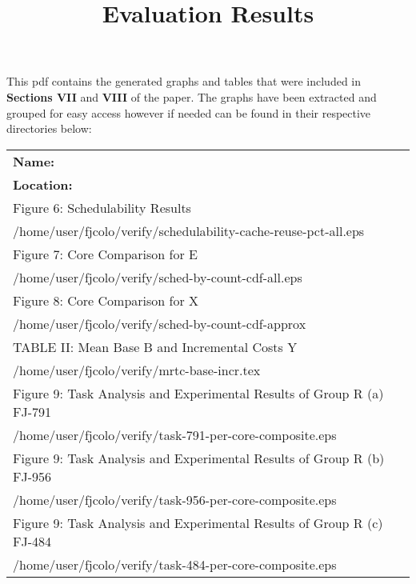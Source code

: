 \documentclass[a4paper]{article}
\title{\vspace{-2.5cm}Evaluation Results}
\date{ }
\begin{document}
\maketitle

This pdf contains the generated graphs and tables that were included in 
\textbf {Sections VII} and \textbf{VIII}
of the paper. The graphs have been extracted and grouped for easy access however if needed can be 
found in their respective directories below:
\begin{center}
  \begin{tabular}{ l c } 
   \textbf{Name:} \\
   \hspace{10mm}\textbf{Location:}\\
   \hline
   Figure 6: Schedulability Results \\ 
   \hspace{10mm} /home/user/fjcolo/verify/schedulability-cache-reuse-pct-all.eps \\
   \hline
   Figure 7: Core Comparison for E \\
   \hspace{10mm}  /home/user/fjcolo/verify/sched-by-count-cdf-all.eps\\ 
   \hline
   Figure 8: Core Comparison for X   \\
   \hspace{10mm} /home/user/fjcolo/verify/sched-by-count-cdf-approx \\ 
   \hline
   TABLE II:  Mean Base B and Incremental Costs Y  \\
   \hspace{10mm}  /home/user/fjcolo/verify/mrtc-base-incr.tex  \\ 
   \hline
   Figure 9: Task Analysis and Experimental Results of Group R (a) FJ-791  \\
   \hspace{10mm} /home/user/fjcolo/verify/task-791-per-core-composite.eps \\ 
   \hline
   Figure 9: Task Analysis and Experimental Results of Group R (b) FJ-956  \\
   \hspace{10mm}  /home/user/fjcolo/verify/task-956-per-core-composite.eps \\ 
   \hline
   Figure 9: Task Analysis and Experimental Results of Group R (c) FJ-484  \\
   \hspace{10mm} /home/user/fjcolo/verify/task-484-per-core-composite.eps \\  
   \hline
  \end{tabular}
 \end{center}
\end{document}
